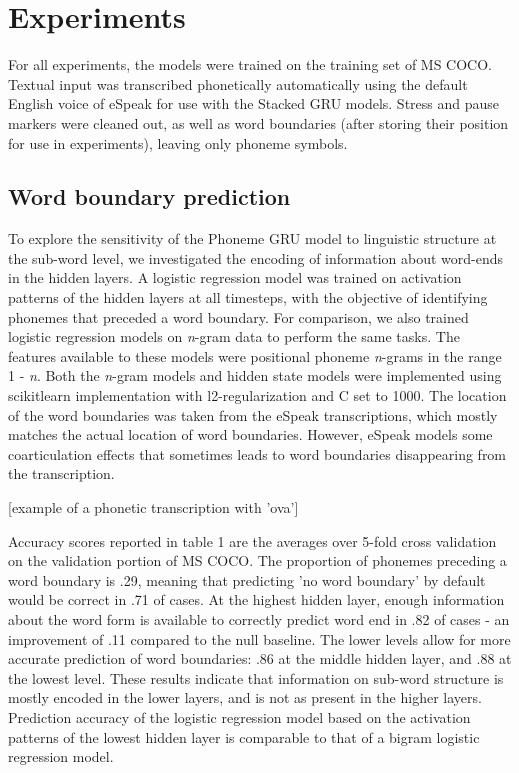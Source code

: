 \section{Experiments}
\label{sec:experiments}

For all experiments, the models were trained on the training set of MS COCO. Textual input was transcribed phonetically automatically using the default English voice of eSpeak for use with the {\sc Stacked GRU} models. Stress and pause markers were cleaned out, as well as word boundaries (after storing their position for use in experiments), leaving only phoneme symbols. %

\subsection{Word boundary prediction}
To explore the sensitivity of the {\sc Phoneme GRU} model to linguistic structure at the sub-word level, we investigated the encoding of information about word-ends in the hidden layers. A logistic regression model was trained on activation patterns of the hidden layers at all timesteps, with the objective of identifying phonemes that preceded a word boundary. For comparison, we also trained logistic regression models on \textit{n}-gram data to perform the same tasks. The features available to these models were positional phoneme \textit{n}-grams in the range 1 - \textit{n}. Both the \textit{n}-gram models and hidden state models were implemented using scikitlearn implementation with l2-regularization and C set to 1000. The location of the word boundaries was taken from the eSpeak transcriptions, which mostly matches the actual location of word boundaries. However, eSpeak models some coarticulation effects that sometimes leads to word boundaries disappearing from the transcription.

[example of a phonetic transcription with 'ova']

Accuracy scores reported in table 1 are the averages over 5-fold cross validation on the validation portion of MS COCO. The proportion of phonemes preceding a word boundary is .29, meaning that predicting 'no word boundary' by default would be correct in .71 of cases. At the highest hidden layer, enough information about the word form is available to correctly predict word end in .82 of cases - an improvement of .11 compared to the null baseline. The lower levels allow for more accurate prediction of word boundaries: .86 at the middle hidden layer, and .88 at the lowest level. These results indicate that information on sub-word structure is mostly encoded in the lower layers, and is not as present in the higher layers. %
Prediction accuracy of the logistic regression model based on the activation patterns of the lowest hidden layer is comparable to that of a bigram logistic regression model.


